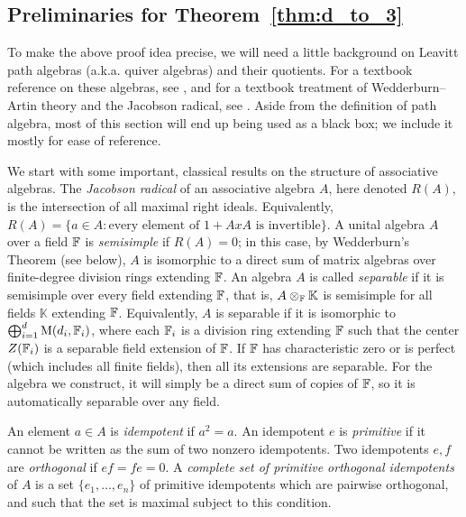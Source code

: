 \documentclass[11pt]{article}
\begin{document}
\subsection{Preliminaries for Theorem~\ref{thm:d_to_3}} \label{sec:dto3_prelim}
To make the above proof idea precise, we will need a little background on Leavitt 
path algebras (a.k.a. quiver algebras) and their quotients. For a textbook reference on these algebras, see
\cite[Ch.~II]{AssemSimsonSkowronski}, and for a textbook treatment of 
Wedderburn--Artin theory and the Jacobson radical, see \cite{lam}. Aside from the 
definition of path algebra, most of this section will end up being used as a black 
box; we include it mostly for ease of reference.

We start with some important, classical results on the structure of associative algebras. The 
\emph{Jacobson radical} of an associative algebra $A$, here denoted $R(A)$, is the 
intersection of all maximal right ideals. Equivalently, $R(A) = \{a \in A : 
\text{every element of } 1 + AxA \text{ is invertible}\}$. A unital algebra $A$ 
over a field $\mathbb{F}$ is \emph{semisimple} if $R(A) = 0$; in this case, by 
Wedderburn's Theorem (see below), $A$ is isomorphic to a direct sum of matrix 
algebras over finite-degree division rings extending $\mathbb{F}$. An algebra $A$ is 
called \emph{separable} if it is semisimple over every field extending $\mathbb{F}$, that 
is, $A \otimes_{\mathbb{F}} \mathbb{K}$ is semisimple for all fields $\mathbb{K}$ 
extending $\mathbb{F}$. Equivalently, $A$ is separable if it is isomorphic to 
$\bigoplus_{i=1}^d \mathrm{M}(d_i,\mathbb{F}_i)$, where each $\mathbb{F}_i$ is a division ring extending 
$\mathbb{F}$ such that the center $Z(\mathbb{F}_i)$ is a separable field extension of $\mathbb{F}$. If 
$\mathbb{F}$ has characteristic zero or is perfect (which includes all finite fields), 
then all its extensions are separable. For the algebra we construct, it will 
simply be a direct sum of copies of $\mathbb{F}$, so it is automatically separable over any field.

An element $a \in A$ is \emph{idempotent} if $a^2 = a$. An idempotent $e$ is \emph{primitive} if it cannot be written as the sum of two nonzero idempotents. Two idempotents $e,f$ are \emph{orthogonal} if $ef = fe = 0$. A \emph{complete set of primitive orthogonal idempotents} of $A$ is a set $\{e_1, \dotsc, e_n\}$ of primitive idempotents which are pairwise orthogonal, and such that the set is maximal subject to this condition. 
\end{document}
